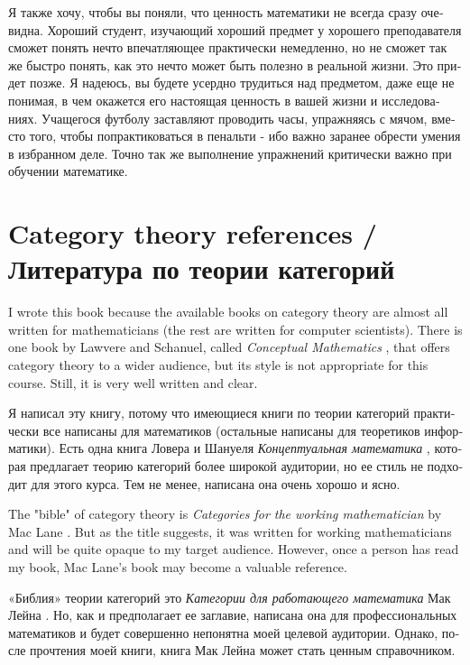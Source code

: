\documentclass{book}
\theoremstyle{theoremENG}
\theoremstyle{lemmaENG}
\theoremstyle{propositionENG}
\theoremstyle{corollaryENG}
\theoremstyle{factENG}
\theoremstyle{remarkENG}
\theoremstyle{exampleENG}
\theoremstyle{warningENG}
\theoremstyle{questionENG}
\theoremstyle{guessENG}
\theoremstyle{answerENG}
\theoremstyle{constructionENG}
\theoremstyle{rulesENG}
\theoremstyle{excENG}
\theoremstyle{appENG}
\theoremstyle{definitionENG}
\theoremstyle{notationENG}
\theoremstyle{conjectureENG}
\theoremstyle{postulateENG}
\theoremstyle{theoremRUS}
\theoremstyle{lemmaRUS}
\theoremstyle{propositionRUS}
\theoremstyle{corollaryRUS}
\theoremstyle{factRUS}
\theoremstyle{remarkRUS}
\theoremstyle{exampleRUS}
\theoremstyle{warningRUS}
\theoremstyle{questionRUS}
\theoremstyle{guessRUS}
\theoremstyle{answerRUS}
\theoremstyle{constructionRUS}
\theoremstyle{rulesRUS}
\theoremstyle{excRUS}
\theoremstyle{appRUS}
\theoremstyle{definitionRUS}
\theoremstyle{notationRUS}
\theoremstyle{conjectureRUS}
\theoremstyle{postulateRUS}
\begin{document}
\begin{english}
\begin{russian}Я также хочу, чтобы вы поняли, что ценность математики не всегда сразу очевидна. Хороший студент, изучающий хороший предмет у хорошего преподавателя сможет понять нечто впечатляющее практически немедленно, но не сможет так же быстро понять, как это нечто может быть полезно в реальной жизни. Это придет позже. Я надеюсь, вы будете усердно трудиться над предметом, даже еще не понимая, в чем окажется его настоящая ценность в вашей жизни и исследованиях. Учащегося футболу заставляют проводить часы, упражняясь с мячом, вместо того, чтобы попрактиковаться в пенальти - ибо важно заранее обрести умения в избранном деле. Точно так же выполнение упражнений критически важно при обучении математике. \end{russian}


\section{Category theory references / Литература по теории категорий}

I wrote this book because the available books on category theory are almost all written for mathematicians (the rest are written for computer scientists). There is one book by Lawvere and Schanuel, called {\em Conceptual Mathematics} \cite{LS}, that offers category theory to a wider audience, but its style is not appropriate for this course. Still, it is very well written and clear.

\begin{russian}Я написал эту книгу, потому что имеющиеся книги по теории категорий практически все написаны для математиков (остальные написаны для теоретиков информатики). Есть одна книга Ловера и Шануеля {\em Концептуальная математика} \cite{LS}, которая предлагает теорию категорий более широкой аудитории, но ее стиль не подходит для этого курса. Тем не менее, написана она очень хорошо и ясно. \end{russian}

The "bible" of category theory is {\em Categories for the working mathematician} by Mac Lane \cite{Mac}. But as the title suggests, it was written for working mathematicians and will be quite opaque to my target audience. However, once a person has read my book, Mac Lane's book may become a valuable reference.

\begin{russian} «Библия» теории категорий это {\em Категории для работающего математика} Мак Лейна \cite{Mac}. Но, как и предполагает ее заглавие, написана она для профессиональных математиков и будет совершенно непонятна моей целевой аудитории. Однако, после прочтения моей книги, книга Мак Лейна может стать ценным справочником.  \end{russian}


\end{english}
\end{document}
